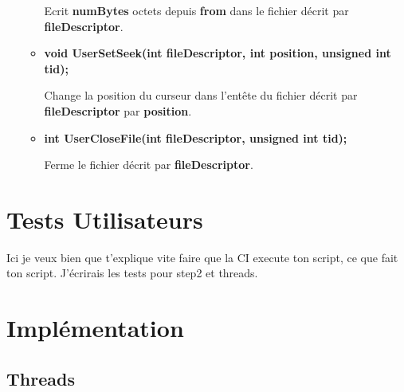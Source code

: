 \documentclass{article}
\begin{document}
\begin{itemize}
\begin{itemize}
	Ecrit \textbf{numBytes} octets depuis \textbf{from} dans le fichier décrit par \textbf{fileDescriptor}.
	
    \item
    \textbf{void UserSetSeek(int fileDescriptor, int position, unsigned int tid);}

	Change la position du curseur dans l'entête du fichier décrit par \textbf{fileDescriptor} par \textbf{position}.

    \item
    \textbf{int UserCloseFile(int fileDescriptor, unsigned int tid);}

	Ferme le fichier décrit par \textbf{fileDescriptor}.

\end{itemize}

\end{itemize}

\newpage

\section{Tests Utilisateurs}

\vspace{5mm}

Ici je veux bien que t'explique vite faire que la CI execute ton script, ce que fait ton script. J'écrirais les tests pour step2 et threads.

\newpage

\section{Implémentation}

\vspace{5mm}

\subsection{Threads}
\end{document}
